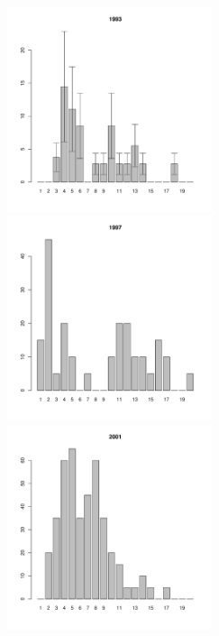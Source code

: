 \documentclass[12pt, a4paper]{article}
\begin{document}
\begin{figure}[h]
\begin{multicols}{3}
\hfill
\includegraphics[width=60mm]{../White_Sea/Luvenga_Goreliy/low_1993_.pdf}
\hfill
\includegraphics[width=60mm]{../White_Sea/Luvenga_Goreliy/low_1997_.pdf}
\hfill
\includegraphics[width=60mm]{../White_Sea/Luvenga_Goreliy/low_2001_.pdf}
\end{multicols}



\end{figure}
\end{document}

